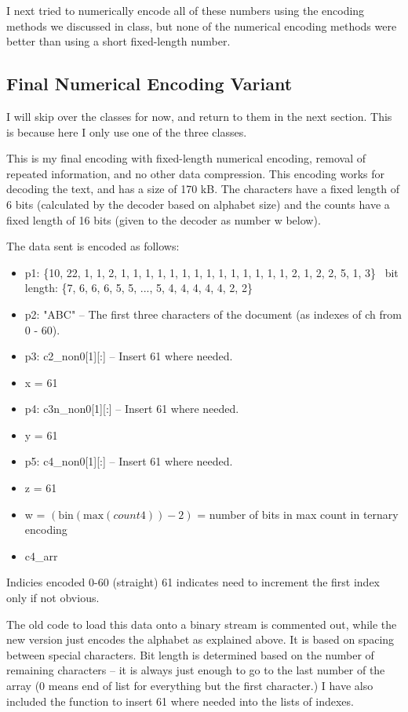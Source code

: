 \documentclass{article}
\begin{document}
I next tried to numerically encode all of these numbers using the encoding methods we discussed in class, but none of the numerical encoding methods were better than using a short fixed-length number. 

\subsection{Final Numerical Encoding Variant}

I will skip over the classes for now, and return to them in the next section. This is because here I only use one of the three classes.

This is my final encoding with fixed-length numerical encoding, removal of repeated information, and no other data compression. This encoding works for decoding the text, and has a size of 170 kB. The characters have a fixed length of 6 bits (calculated by the decoder based on alphabet size) and the counts have a fixed length of 16 bits (given to the decoder as number w below).

The data sent is encoded as follows:
\begin{itemize}
\item p1: \{10, 22, 1, 1, 2, 1, 1, 1, 1, 1, 1, 1, 1, 1, 1, 1, 1, 1, 1, 2, 1, 2, 2, 5, 1, 3\} \
bit length: \{7, 6, 6, 6, 5, 5, ..., 5, 4, 4, 4, 4, 4, 2, 2\}
\item p2: "ABC" -- The first three characters of the document (as indexes of ch from  0 - 60). 
\item p3: c2\_non0[1][:] -- Insert 61 where needed.
\item x = 61
\item p4: c3n\_non0[1][:] -- Insert 61 where needed.
\item y = 61
\item p5: c4\_non0[1][:] -- Insert 61 where needed.
\item z = 61
\item w = $\left(\mathrm{bin}\left(\mathrm{max}\left(count4\right)\right) - 2\right)$ = number of bits in max count in ternary encoding
\item c4\_arr
\end{itemize}

\noindent Indicies encoded 0-60 (straight) 61 indicates need to increment the first index only if not obvious.

The old code to load this data onto a binary stream is commented out, while the new version just encodes the alphabet as explained above. It is based on spacing between special characters. Bit length is determined based on the number of remaining characters -- it is always just enough to go to the last number of the array (0 means end of list for everything but the first character.) I have also included the function to insert 61 where needed into the lists of indexes.
\end{document}
